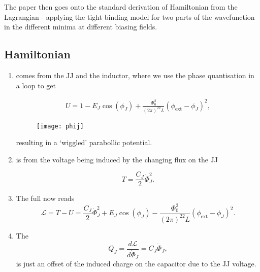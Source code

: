 The paper then goes onto  the standard derivation of Hamiltonian from
the Lagrangian  - applying the tight  binding model for two  parts of
the wavefunction in the different minima at different biasing fields.

\subsection{Hamiltonian}
\label{sec:hamiltonian}

\begin{enumerate}
\item {} comes  from the JJ and the
  inductor, where we use the phase quantisation in a loop to get

  {\begin{equation}
      \label{l3-energy1}
      \begin{aligned}
        U          =           1          -E_J\cos(\phi_J)          +
        \frac{\Phi_0^2}{(2\pi)^22L}(\phi_\text{ext}-\phi_J)^2,
      \end{aligned}
    \end{equation}}
  \begin{figure}[h]
    \centering \texttt{[image: phij]}
  \end{figure}

  \noindent
  \noindent resulting in a `wiggled' parabollic potential.

\item {} is from  the voltage
  being induced by the changing flux on the JJ

  \begin{equation}
    T = \frac{C_J}{2}\dot{\Phi}_J^2.
  \end{equation}

\item The full  now reads
  \begin{equation}
    \mathcal{L} = T - U = \frac{C_J}{2}\dot{\Phi}_J^2 + E_J\cos(\phi_J) - \frac{\Phi_0^2}{(2\pi)^22L}(\phi_\text{ext}-\phi_J)^2.
  \end{equation}

\item The \textbf{}
  \begin{equation}
    Q_J = \frac{d\mathcal{L}}{d\dot{\Phi}_J} = C_J\dot{\Phi}_J,
  \end{equation}
  \noindent is just an offset of  the induced charge on the capacitor
  due to the JJ voltage.


\end{enumerate}
